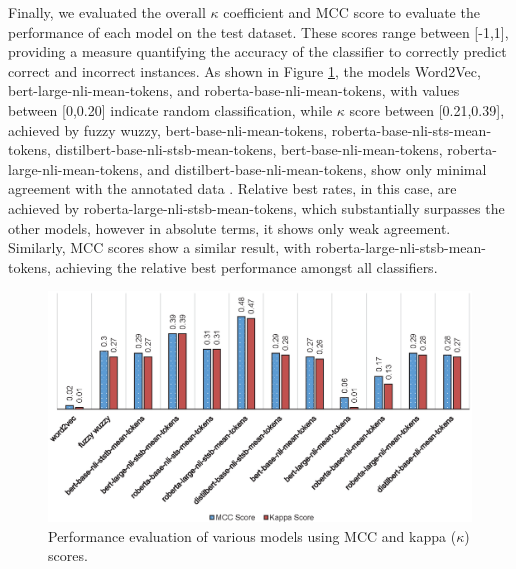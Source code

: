 \documentclass{ieeeaccess}
\begin{document}
Finally, we evaluated the overall $\kappa$ coefficient and MCC score to evaluate the performance of each model on the test dataset. These scores range between [-1,1], providing a measure quantifying the accuracy of the classifier to correctly predict correct and incorrect instances. As shown in Figure \ref{fig:evaluation}, the models Word2Vec, bert-large-nli-mean-tokens, and roberta-base-nli-mean-tokens, with values between [0,0.20] indicate random classification, while $\kappa$ score between [0.21,0.39], achieved by fuzzy wuzzy, bert-base-nli-mean-tokens, roberta-base-nli-sts-mean-tokens, distilbert-base-nli-stsb-mean-tokens, bert-base-nli-mean-tokens, roberta-large-nli-mean-tokens, and distilbert-base-nli-mean-tokens, show only minimal agreement with the annotated data \cite{mchugh2012interrater}.  Relative best rates, in this case, are achieved by roberta-large-nli-stsb-mean-tokens, which substantially surpasses the other models, however in absolute terms, it shows only weak agreement. Similarly, MCC scores show a similar result, with roberta-large-nli-stsb-mean-tokens, achieving the relative best performance amongst all classifiers.

\begin{figure}[t!]
	\centering
	\includegraphics[scale=0.83]{evaluation}
	\caption{Performance evaluation of various models using MCC and kappa ($\kappa$) scores.}
	\label{fig:evaluation}
\end{figure}
\end{document}
